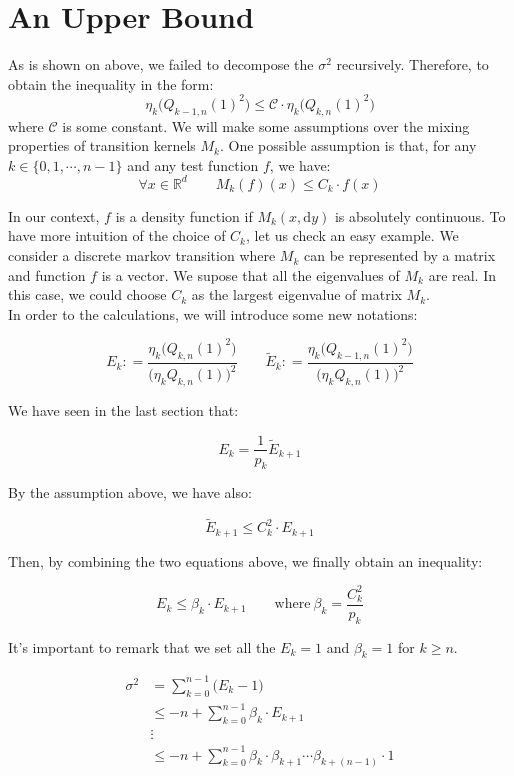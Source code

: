 \documentclass[a4paper,10pt]{article}
\begin{document}
\section{An Upper Bound}

As is shown on above, we failed to decompose the $\sigma^2$ recursively.
Therefore, to obtain the inequality in the form:
$$\eta_k \big( Q_{k-1,n}(1)^2 \big) \leq \mathcal{C}\cdot \eta_k \big( Q_{k,n}(1)^2\big)$$
where $\mathcal{C}$ is some constant. We will make some assumptions over the mixing properties of transition kernels $M_k$.
One possible assumption is that, for any $k \in \{0,1,\cdots,n-1\}$ and any test function $f$, we have:
$$\forall x \in \mathds{R}^d \qquad M_k(f)(x) \leq C_k \cdot f(x)$$

In our context, $f$ is a density function if $M_k(x,\mathrm{d}y)$ is absolutely
continuous. To have more intuition of the choice of $C_k$, let us check an easy example.
We consider a discrete markov transition where $M_k$ can be represented by a
matrix and function $f$ is a vector. We supose that all the eigenvalues 
of $M_k$ are real. In this case, we could choose 
$C_k$ as the largest eigenvalue of matrix $M_k$.\\ 
In order to the calculations, we will introduce some new notations:

$$E_k : = \frac{\eta_{k} \big(Q_{k,n}(1)^2\big)}{\big(\eta_{k} Q_{k,n}(1)\big)^2}
\qquad
\tilde E_k : =  \frac{\eta_{k} \big(Q_{k-1,n}(1)^2\big)}{\big(\eta_{k} Q_{k,n}(1)\big)^2}$$ 

We have seen in the last section that:

$$E_k = \frac{1}{p_k}\tilde E_{k+1}$$

By the assumption above, we have also:

$$ \tilde E_{k+1} \leq C_k^2 \cdot E_{k+1}$$

Then, by combining the two equations above, we finally obtain an inequality:

$$E_k \leq \beta_k  \cdot E_{k+1} \qquad \text{where} \  \beta_k = \frac{C_k^2}{p_k}$$

It's important to remark that we set all the $E_k = 1$ and $\beta_k = 1$ for $k \geq n$.

\begin{equation*}
        \begin{split}
                \sigma^2 &= \sum_{k = 0}^{n-1} \big( E_k - 1\big) \\
                &\leq -n +\sum _{k=0}^{n-1} \beta_k \cdot E_{k+1}\\
                &\vdots \\
                &\leq -n + \sum_{k=0}^{n-1} \beta_k \cdot \beta_{k+1}\cdots \beta_{k+(n-1)}\cdot 1\\
        \end{split}
\end{equation*}
\end{document}
